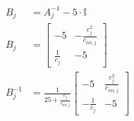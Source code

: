 \documentclass{article}
\begin{document}
\begin{align*}
	B_j                 & = A_j^{-1} - 5\cdot\mathbb{I}                                                                                                                                                                                                                                                                                                                                                                                                                                                                                                                                                                                                                                                                                                                                         \\
	B_j                 & = \begin{bmatrix} -5 & -\frac{c^2_j}{c_{nn, j}}  \\ \frac{1}{c_j} & -5 \end{bmatrix}                                                                                                                                                                                                                                                                                                                                                                                                                                                                                                                                                                                                                                                            \\
	B_j^{-1}            & = \frac{1}{25 + \frac{c_j}{c_{nn, j}}}\begin{bmatrix} -5 & \frac{c^2_j}{c_{nn, j}}  \\ -\frac{1}{c_j} & -5 \end{bmatrix}                                                                                                                                                                                                                                                                                                                                                                                                                                                                                                                                                                                                                        \\

\end{align*}
\end{document}
